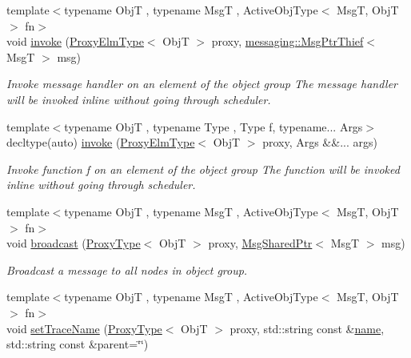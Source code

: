 \begin{DoxyCompactItemize}
{\footnotesize template$<$typename ObjT , typename MsgT , Active\+Obj\+Type$<$ Msg\+T, Obj\+T $>$ fn$>$ }\\void \hyperlink{structvt_1_1objgroup_1_1_obj_group_manager_a5ff347b7aca2c08892d3206c4b028fd3}{invoke} (\hyperlink{structvt_1_1objgroup_1_1_obj_group_manager_adba6c8ecb0f4c30e719f1abb995cfc9b}{Proxy\+Elm\+Type}$<$ ObjT $>$ proxy, \hyperlink{structvt_1_1messaging_1_1_msg_ptr_thief}{messaging\+::\+Msg\+Ptr\+Thief}$<$ MsgT $>$ msg)
\begin{DoxyCompactList}\small\item\em Invoke message handler on an element of the object group The message handler will be invoked inline without going through scheduler. \end{DoxyCompactList}\item 
{\footnotesize template$<$typename ObjT , typename Type , Type f, typename... Args$>$ }\\decltype(auto) \hyperlink{structvt_1_1objgroup_1_1_obj_group_manager_a86ceeea91a50386d51d5b6af06196d29}{invoke} (\hyperlink{structvt_1_1objgroup_1_1_obj_group_manager_adba6c8ecb0f4c30e719f1abb995cfc9b}{Proxy\+Elm\+Type}$<$ ObjT $>$ proxy, Args \&\&... args)
\begin{DoxyCompactList}\small\item\em Invoke function \textquotesingle{}f\textquotesingle{} on an element of the object group The function will be invoked inline without going through scheduler. \end{DoxyCompactList}\item 
{\footnotesize template$<$typename ObjT , typename MsgT , Active\+Obj\+Type$<$ Msg\+T, Obj\+T $>$ fn$>$ }\\void \hyperlink{structvt_1_1objgroup_1_1_obj_group_manager_a11a5b325363050d55b7428c84bcaa24b}{broadcast} (\hyperlink{structvt_1_1objgroup_1_1_obj_group_manager_aea65eef52f240a52210132eef5ce591f}{Proxy\+Type}$<$ ObjT $>$ proxy, \hyperlink{namespacevt_ab2b3d506ec8e8d1540aede826d84a239}{Msg\+Shared\+Ptr}$<$ MsgT $>$ msg)
\begin{DoxyCompactList}\small\item\em Broadcast a message to all nodes in object group. \end{DoxyCompactList}\item 
{\footnotesize template$<$typename ObjT , typename MsgT , Active\+Obj\+Type$<$ Msg\+T, Obj\+T $>$ fn$>$ }\\void \hyperlink{structvt_1_1objgroup_1_1_obj_group_manager_a922a82ded79fdefb5fd7de60bde77aad}{set\+Trace\+Name} (\hyperlink{structvt_1_1objgroup_1_1_obj_group_manager_aea65eef52f240a52210132eef5ce591f}{Proxy\+Type}$<$ ObjT $>$ proxy, std\+::string const \&\hyperlink{structvt_1_1objgroup_1_1_obj_group_manager_a92c0b07c2d90063c40087f625880cca3}{name}, std\+::string const \&parent=\char`\"{}\char`\"{})

\end{DoxyCompactItemize}
